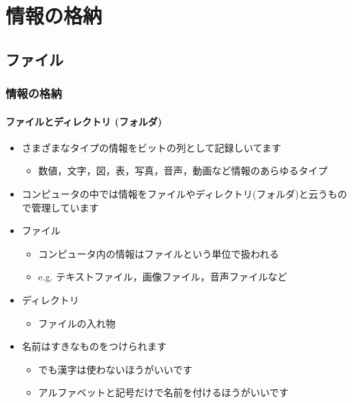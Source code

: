 \section{情報の格納}
\subsection{ファイル}
\begin{frame}[shrink]
\frametitle{情報の格納}
\framesubtitle{ファイルとディレクトリ (フォルダ)}
  \begin{itemize}
\item さまざまなタイプの情報をビットの列として記録しいてます
    \begin{itemize}
\item 数値，文字，図，表，写真，音声，動画など情報のあらゆるタイプ
    \end{itemize}
\item コンピュータの中では情報をファイルやディレクトリ(フォルダ)と云うもので管理しています
\item ファイル
    \begin{itemize}
\item コンピュータ内の情報はファイルという単位で扱われる
\item e.g. テキストファイル，画像ファイル，音声ファイルなど
    \end{itemize}
\item ディレクトリ
    \begin{itemize}
\item ファイルの入れ物
    \end{itemize}
\item 名前はすきなものをつけられます
    \begin{itemize}
\item でも漢字は使わないほうがいいです
\item アルファベットと記号だけで名前を付けるほうがいいです
    \end{itemize}
  \end{itemize}
\end{frame}
